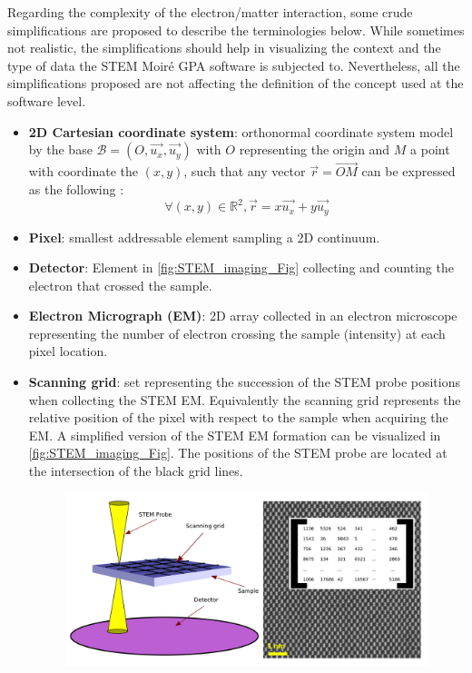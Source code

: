 \documentclass[12pt]{article}
\begin{document}
Regarding the complexity of the electron/matter interaction, some crude  
simplifications are proposed to describe the terminologies below. While 
sometimes not realistic, the simplifications should help in visualizing the 
context and the type of data the STEM Moir{\'e} GPA software is subjected to. 
Nevertheless, all the simplifications proposed are not affecting the definition 
of the concept used at the software level.

\begin{itemize}

\item \textbf{2D Cartesian coordinate system}: orthonormal coordinate system 
model by the base $\mathcal{B}=(O,\vec{u_x},\vec{u_y})$ with $O$ representing 
the origin and $M$ a point with coordinate the $(x,y)$, such that any vector 
$\vec{r}=\overrightarrow{\mathit{OM}}$ can be expressed as the following :
\begin{equation}
\forall (x,y) \in \mathbb{R}^{2}, \vec{r}=x\vec{u_x}+y\vec{u_y}
\end{equation}
\item \textbf{Pixel}: smallest addressable element sampling a 2D continuum.
\item \textbf{Detector}: Element in \cref{fig:STEM_imaging_Fig} collecting and 
counting the electron that crossed the sample.
\item \textbf{Electron Micrograph (EM)}: 2D array collected in an electron 
microscope representing the number of electron crossing the sample (intensity) 
at each pixel location.
\item \textbf{Scanning grid}: set representing the succession of the STEM probe 
positions when collecting the STEM EM. Equivalently the scanning grid represents 
the relative position of the pixel with respect to the sample when acquiring the 
EM. A simplified version of the 
STEM EM formation can be visualized in \cref{fig:STEM_imaging_Fig}. The 
positions of the STEM probe are located at the intersection of the black grid 
lines.
\begin{figure}[H]
\begin{center}
\includegraphics[scale=0.7]{Figures/STEM_imaging_Fig.png}

\end{center}
\end{figure}
\end{itemize}
\end{document}
